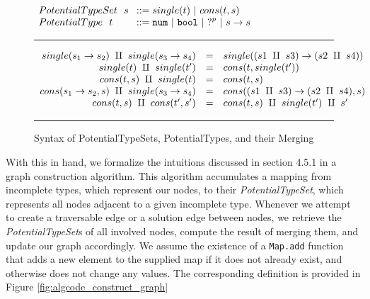 \begin{figure}[hbp!]
\centering
\vspace{-3px} 
$\arraycolsep=4pt\begin{array}{lll}
PotentialTypeSet~~ s & ::= 
single(t) ~\vert~ 
cons(t, s)
\\
PotentialType~~ t & ::= 
  \tnum ~\vert~
  \tbool ~\vert~
  \tehole^p ~\vert~
  \tarr{s}{s}
  \\
\end{array}$
\label{fig:syntax_possible_type_sets}
\vspace{5px}
\hrule
\[\begin{array}{rcl}
    single(s_1 \rightarrow s_2) ~\amalg~ single(s_3 \rightarrow s_4) & = & single({(s1 ~\amalg~ s3) \rightarrow (s2 ~\amalg~ s4)}) \\
    single(t) ~\amalg~ single(t') & = & cons(t, single(t')) \\
    cons(t,s) ~\amalg~ single(t) & = & cons(t, s) \\
    cons(s_1 \rightarrow s_2, s) ~\amalg~ single(s_3 \rightarrow s_4) & = & cons((s1 ~\amalg~ s3) \rightarrow (s2 ~\amalg~ s4) , s) \\
    cons(t,s) ~\amalg~ cons(t',s') & = & cons(t,s) ~\amalg~ single(t') ~\amalg~ s' \\
\end{array}\] 
\caption{Syntax of PotentialTypeSets, PotentialTypes, and their Merging}
\vspace{5px} 
\hrule
\label{fig:possible_type_sets}
\vspace{-5px}
\end{figure}

With this in hand, we formalize the intuitions discussed in section 4.5.1 in a graph construction algorithm. This algorithm accumulates a mapping from incomplete types, which represent our nodes, to their \emph{PotentialTypeSet}, which represents all nodes adjacent to a given incomplete type. Whenever we attempt to create a traversable edge or a solution edge between nodes, we retrieve the \emph{PotentialTypeSet}s of all involved nodes, compute the result of merging them, and update our graph accordingly. We assume the existence of a \lstinline{Map.add} function that adds a new element to the supplied map if it does not already exist, and otherwise does not change any values. The corresponding definition is provided in Figure \ref{fig:algcode_construct_graph}

